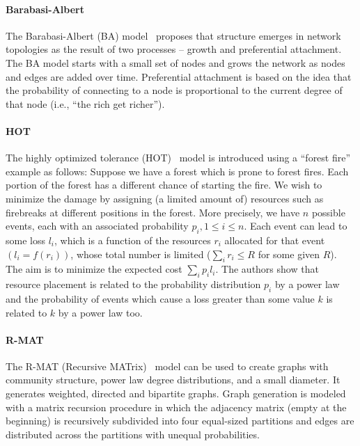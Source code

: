 \paragraph{Barabasi-Albert} The Barabasi-Albert (BA) model~\cite{Barabasi99emergenceScaling} proposes that structure emerges in network topologies as the result of two processes -- growth and preferential attachment. The BA model starts with a small set of nodes and grows the network as nodes and edges are added over time. Preferential attachment is based on the idea that the probability of connecting to a node is proportional to the current degree of that node (i.e., ``the rich get richer'').

\paragraph{HOT} The highly optimized tolerance (HOT)~\cite{PhysRevLett.84.2529} model is introduced  using a ``forest fire'' example as follows: Suppose we have a forest which is prone to forest fires. Each portion of the forest has a different chance of starting the fire. We wish to minimize the damage by assigning (a limited amount of) resources such as firebreaks at different positions in the forest. More precisely, we have $n$ possible events, each with an associated probability $p_i, 1 \le i \le n$. Each event can lead to some loss $l_i$, which is a function of the resources $r_i$ allocated for that event $(l_i = f (r_i))$, whose total number is limited ($\sum_i r_i \le R$ for some given $R$). The aim is to minimize the expected cost $\sum_i p_i l_i$. The authors show that resource placement is related to the probability distribution $p_i$ by a power law and the probability of events which cause a loss greater than some value $k$ is related to $k$ by a power law too.


\paragraph{R-MAT} The R-MAT (Recursive MATrix)~\cite{DBLP:conf/sdm/ChakrabartiZF04} model can be used to create graphs with community structure, power law degree distributions, and a small diameter. It generates weighted, directed and bipartite graphs. Graph generation is modeled with a matrix recursion procedure in which the adjacency matrix (empty at the beginning) is recursively subdivided into four equal-sized partitions and edges are distributed across the partitions with unequal probabilities.
\\



